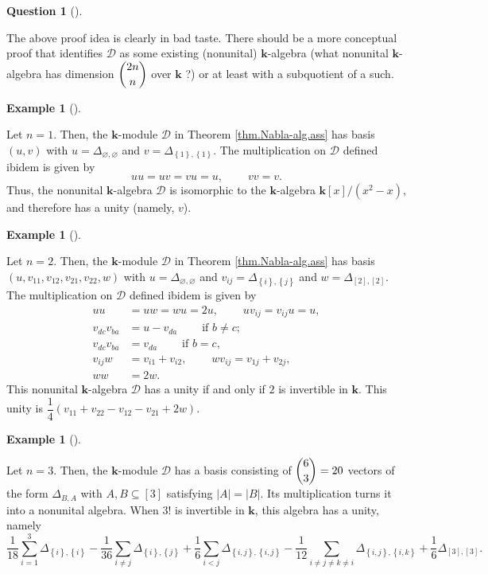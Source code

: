 \documentclass[numbers=enddot,12pt,final,onecolumn,notitlepage]{scrartcl}%
\numberwithin{exer}{subsection}
\theoremstyle{definition}
\newtheorem{quest}[theo]{Question}
\newenvironment{question}[1][]
{\begin{quest}[#1]\begin{leftbar}}
{\end{leftbar}\end{quest}}
\newtheorem{exam}[theo]{Example}
\newenvironment{example}[1][]
{\begin{exam}[#1]\begin{leftbar}}
{\end{leftbar}\end{exam}}
\newenvironment{question}[1][Question]{\noindent\textbf{#1.} }{\ \rule{0.5em}{0.5em}}
\let\sumnonlimits\sum
\renewcommand{\sum}{\sumnonlimits\limits}
\begin{document}
\begin{question}
The above proof idea is clearly in bad taste. There should be a more
conceptual proof that identifies $\mathcal{D}$ as some existing (nonunital)
$\mathbf{k}$-algebra (what nonunital $\mathbf{k}$-algebra has dimension
$\dbinom{2n}{n}$ over $\mathbf{k}$ ?) or at least with a subquotient of a such.
\end{question}

\begin{example}
Let $n=1$. Then, the $\mathbf{k}$-module $\mathcal{D}$ in Theorem
\ref{thm.Nabla-alg.ass} has basis $\left(  u,v\right)  $ with $u=\Delta
_{\varnothing,\varnothing}$ and $v=\Delta_{\left\{  1\right\}  ,\left\{
1\right\}  }$. The multiplication on $\mathcal{D}$ defined ibidem is given by%
\[
uu=uv=vu=u,\ \ \ \ \ \ \ \ \ \ vv=v.
\]
Thus, the nonunital $\mathbf{k}$-algebra $\mathcal{D}$ is isomorphic to the
$\mathbf{k}$-algebra $\mathbf{k}\left[  x\right]  /\left(  x^{2}-x\right)  $,
and therefore has a unity (namely, $v$).
\end{example}

\begin{example}
\label{exa.Nabla-alg.n=2}Let $n=2$. Then, the $\mathbf{k}$-module
$\mathcal{D}$ in Theorem \ref{thm.Nabla-alg.ass} has basis $\left(
u,v_{11},v_{12},v_{21},v_{22},w\right)  $ with $u=\Delta_{\varnothing
,\varnothing}$ and $v_{ij}=\Delta_{\left\{  i\right\}  ,\left\{  j\right\}  }$
and $w=\Delta_{\left[  2\right]  ,\left[  2\right]  }$. The multiplication on
$\mathcal{D}$ defined ibidem is given by%
\begin{align*}
uu  &  =uw=wu=2u,\ \ \ \ \ \ \ \ \ \ uv_{ij}=v_{ij}u=u,\\
v_{dc}v_{ba}  &  =u-v_{da}\ \ \ \ \ \ \ \ \ \ \text{if }b\neq c;\\
v_{dc}v_{ba}  &  =v_{da}\ \ \ \ \ \ \ \ \ \ \text{if }b=c,\\
v_{ij}w  &  =v_{i1}+v_{i2},\ \ \ \ \ \ \ \ \ \ wv_{ij}=v_{1j}+v_{2j},\\
ww  &  =2w.
\end{align*}
This nonunital $\mathbf{k}$-algebra $\mathcal{D}$ has a unity if and only if
$2$ is invertible in $\mathbf{k}$. This unity is $\dfrac{1}{4}\left(
v_{11}+v_{22}-v_{12}-v_{21}+2w\right)  $.
\end{example}

\begin{example}
Let $n=3$. Then, the $\mathbf{k}$-module $\mathcal{D}$ has a basis consisting
of $\dbinom{6}{3}=20$ vectors of the form $\Delta_{B,A}$ with $A,B\subseteq
\left[  3\right]  $ satisfying $\left\vert A\right\vert =\left\vert
B\right\vert $. Its multiplication turns it into a nonunital algebra. When
$3!$ is invertible in $\mathbf{k}$, this algebra has a unity, namely%
\[
\dfrac{1}{18}\sum_{i=1}^{3}\Delta_{\left\{  i\right\}  ,\left\{  i\right\}
}-\dfrac{1}{36}\sum_{i\neq j}\Delta_{\left\{  i\right\}  ,\left\{  j\right\}
}+\dfrac{1}{6}\sum_{i<j}\Delta_{\left\{  i,j\right\}  ,\left\{  i,j\right\}
}-\dfrac{1}{12}\sum_{i\neq j\neq k\neq i}\Delta_{\left\{  i,j\right\}
,\left\{  i,k\right\}  }+\dfrac{1}{6}\Delta_{\left[  3\right]  ,\left[
3\right]  }.
\]

\end{example}
\end{document}

